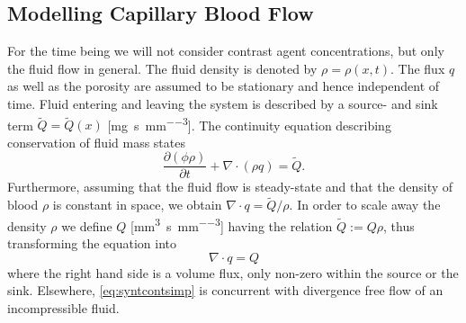 \documentclass[journal,twocolumn]{IEEEtran}
\newcommand{\siQmm}{\milli\meter\cubed\per\second\per\milli\meter\cubed}
\newcommand{\sirho}{\milli\gram\per\milli\meter\cubed}
\newcommand{\siQtilde}{\milli\gram\per\second\per\milli\meter\cubed}
\newcommand{\simm}{\milli\meter\cubed}
\begin{document}
	
	
	

	
	\subsection{Modelling Capillary Blood Flow}\label{sec:flow}
	
	For the time being we will not consider contrast agent concentrations, but only the fluid flow in general.
	The fluid density is denoted by $\rho = \rho(x,t)$. 
	The flux $q$ as well as the porosity 
	are assumed to be stationary and hence independent of time.
	Fluid entering and leaving the system is described by a source- and sink term $\tilde{Q} = \tilde{Q}(x)$ [\si{\siQtilde}]. 
	The continuity equation describing conservation of fluid mass states
	\begin{equation}
		\frac{\partial (\phi \rho)}{\partial t} + \nabla \cdot (\rho q) = \tilde{Q}.
		\label{eq:syntcont}
	\end{equation} 
	Furthermore, assuming that the fluid flow is steady-state and that the density of blood $\rho$ is constant in space, we obtain $\nabla \cdot q = \tilde{Q}/\rho$.
	In order to scale away the density $\rho$ we define $Q$ [\si{\siQmm}] having the relation $\tilde{Q} := Q\rho$, thus transforming the equation into 
	\begin{equation}
		\nabla \cdot q = Q
		\label{eq:syntcontsimp}
	\end{equation}
	where the right hand side is a volume flux, only non-zero within the source or the sink. 
	Elsewhere, \eqref{eq:syntcontsimp} is concurrent with divergence free flow of an incompressible fluid.
	
\end{document}
